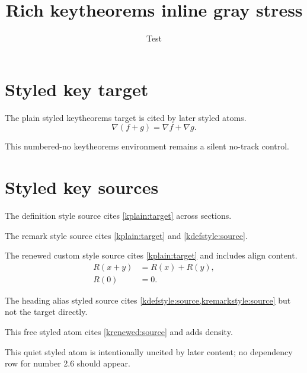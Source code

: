 \documentclass{article}
\title{Rich keytheorems inline gray stress}
\author{Test}
\date{}
\begin{document}
\START
\maketitle

\section{Styled key target}
\label{sec:key-gray-target}

\begin{kplain}\label{kplain:target}
The plain styled keytheorems target is cited by later styled atoms.
\begin{equation}\label{eq:key-gray-target}
  \nabla(f+g)=\nabla f+\nabla g.
\end{equation}
\end{kplain}

\begin{ksilent}\label{ksilent:unnumbered}
This numbered-no keytheorems environment remains a silent no-track control.
\end{ksilent}

\section{Styled key sources}
\label{sec:key-gray-sources}

\begin{kdefstyle}\label{kdefstyle:source}
The definition style source cites \cref{kplain:target} across sections.
\end{kdefstyle}

\begin{kremarkstyle}\label{kremarkstyle:source}
The remark style source cites \autoref{kplain:target} and \cref{kdefstyle:source}.
\end{kremarkstyle}

\begin{krenewed}\label{krenewed:source}
The renewed custom style source cites \cref{kplain:target} and includes align content.
\begin{align}
  R(x+y) &= R(x)+R(y),\\
  R(0) &= 0.
\end{align}
\end{krenewed}

\begin{kheading}\label{kheading:source}
The heading alias styled source cites \cref{kdefstyle:source,kremarkstyle:source} but not the target directly.
\end{kheading}

\begin{kfree}\label{kfree:style-density}
This free styled atom cites \cref{krenewed:source} and adds density.
\end{kfree}

\begin{kfree}\label{kfree:quiet}
This quiet styled atom is intentionally uncited by later content; no dependency row for number 2.6 should appear.
\end{kfree}

\END
\end{document}
